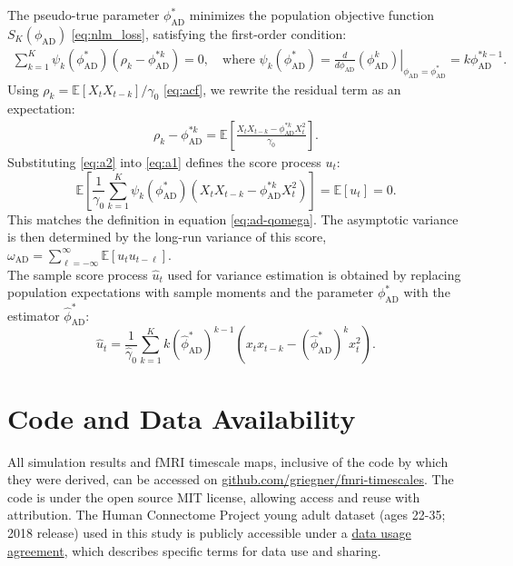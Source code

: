 \documentclass[9pt]{article}
\newcommand{\phiad}{\phi_{\scriptscriptstyle\text{AD}}}
\newcommand{\hatphiad}{\hat{\phi}^*_{\scriptscriptstyle\text{AD}}}
\newcommand{\omegaad}{\omega_{\scriptscriptstyle\text{AD}}}
\begin{document}
\noindent The pseudo-true parameter $\phiad^*$ minimizes the population objective function $S_K(\phiad)$ \eqref{eq:nlm_loss}, satisfying the first-order condition:
\begin{align}\label{eq:a1}
    \sum_{k=1}^{K} \psi_k(\phiad^*) (\rho_k - \phiad^{*k}) = 0, \quad \text{where } \psi_k(\phiad^*) = \left. \frac{d}{d\phiad}(\phiad^k) \right|_{\phiad=\phiad^*} = k\phi_{\text{AD}}^{*k-1}.
\end{align}
Using $\rho_k = \mathbb{E}[X_t X_{t-k}]/\gamma_0$ \eqref{eq:acf}, we rewrite the residual term as an expectation:
\begin{align}\label{eq:a2}
    \rho_k - \phiad^{*k} = \mathbb{E}\left[ \frac{X_t X_{t-k} - \phiad^{*k} X_t^2}{\gamma_0} \right].
\end{align}
Substituting \eqref{eq:a2} into \eqref{eq:a1} defines the score process $u_t$:
\begin{equation}
    \mathbb{E}\left[ \frac{1}{\gamma_0} \sum_{k=1}^{K} \psi_k(\phiad^*) (X_t X_{t-k} - \phiad^{*k} X_t^2) \right] = \mathbb{E}[u_t] = 0.
\end{equation}
This matches the definition in equation \eqref{eq:ad-qomega}. The asymptotic variance is then determined by the long-run variance of this score, $\omegaad = \sum_{\ell=-\infty}^{\infty} \mathbb{E}[u_t u_{t-\ell}]$.\\

\noindent The sample score process $\hat{u}_t$ used for variance estimation is obtained by replacing population expectations with sample moments and the parameter $\phiad^*$ with the estimator $\hatphiad$:
\begin{equation}
    \hat{u}_t = \frac{1}{\hat{\gamma}_0} \sum_{k=1}^{K} k (\hatphiad)^{k-1} (x_t x_{t-k} - (\hatphiad)^k x_t^2).
\end{equation}

\section*{Code and Data Availability}
All simulation results and fMRI timescale maps, inclusive of the code by which they were derived, can be accessed on \href{https://github.com/griegner/fmri-timescales}{github.com/griegner/fmri-timescales}. The code is under the open source MIT license, allowing access and reuse with attribution. The Human Connectome Project young adult dataset (ages 22-35; 2018 release) used in this study is publicly accessible under a \href{https://www.humanconnectome.org/storage/app/media/data_use_terms/DataUseTerms-HCP-Open-Access-26Apr2013.pdf}{data usage agreement}, which describes specific terms for data use and sharing.
\end{document}
